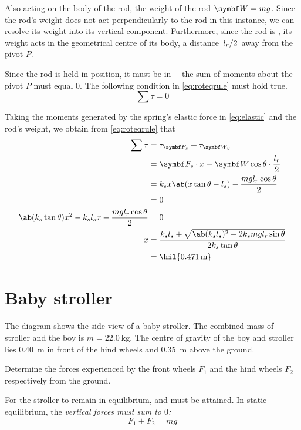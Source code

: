 Also acting on the body of the rod, the weight of the rod \(\mv{W} = mg\). Since
the rod's weight does not act perpendicularly to the rod in this instance, we
can resolve its weight into its vertical component. Furthermore, since the rod
is , its weight acts in the geometrical centre of its
body, a distance \(\lf{l_r}{2}\)
away from the pivot \(P\).

Since the rod is held in position, it must be in ---the
sum of moments about the pivot \(P\) must equal \(0\). The following
condition in \cref{eq:roteqrule} must hold true.
\begin{equation}
  \sum\tau = 0
  \label{eq:roteqrule}
\end{equation}

Taking the moments generated by the spring's elastic force in
\cref{eq:elastic} and
the rod's weight, we obtain from \cref{eq:roteqrule} that
\begin{align*}
  \sum\tau &= \tau_{\mv{F}_s} + \tau_{\mv{W}_y} \\
  &= \mv{F}_s\cdot x - \mv{W}\cos\theta\cdot\f{l_r}{2} \\
  &= k_sx\ab(x\tan\theta - l_s) - \f{mgl_r\cos\theta}{2} \\
  &= 0 \\
  \ab(k_s\tan\theta)x^2 - k_sl_sx -\f{mgl_r\cos\theta}{2} &= 0\\
  x&= \f{k_sl_s + \sqrt{\ab(k_sl_s)^2 + 2k_smgl_r\sin\theta}}{2k_s\tan\theta} \\
  &= \hil{\qty{0.471}{\metre}}
\end{align*}

\section{Baby stroller}
\begin{problem}
  The diagram shows the side view of a baby stroller. The combined
  mass of stroller and the boy is \(m = \qty{22.0}{\kilo\gram}\). The centre
  of gravity of the boy and stroller lies \qty{0.40}{\metre} in front
  of the hind wheels
  and \qty{0.35}{\metre} above the ground.

  Determine the forces experienced by the front wheels \(F_1\) and
  the hind wheels
  \(F_2\) respectively from the ground.
\end{problem}

For the stroller to remain in equilibrium, 
and 
must be attained. In static equilibrium, the \it{vertical} forces
must sum to \(0\):
\begin{equation}
  F_1 + F_2 = mg
  \label{eq:stateq}
\end{equation}

